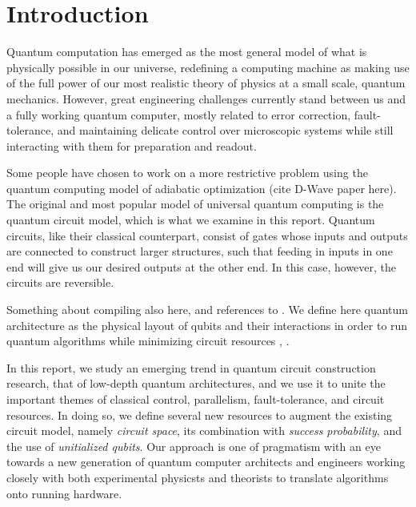 \section{Introduction}
\label{sec:intro}

Quantum computation has emerged as the most general model of what is
physically possible in our universe, redefining a computing machine as
making use of the full power of our most realistic theory of physics
at a small scale, quantum mechanics. However, great engineering challenges
currently stand between us and a fully working quantum computer, mostly
related to error correction, fault-tolerance, and maintaining delicate
control over microscopic systems while still interacting with them for
preparation and readout.

Some people have chosen to work on a more restrictive problem using
the quantum computing model of adiabatic optimization (cite D-Wave paper here).
The original and most popular model of universal quantum computing is the
quantum circuit model, which is what we examine in this report.
Quantum circuits, like their classical counterpart, consist of gates
whose inputs and outputs are connected to construct larger structures,
such that feeding in inputs in one end will give us our desired outputs at
the other end. In this case, however, the circuits are reversible.

Something about compiling also here, and references to
\cite{Pham2012a}. We define here quantum architecture as the physical
layout of qubits and their interactions in order to run quantum algorithms
while minimizing circuit resources \cite{VanMeter2006}, \cite{Pham2012b}.


In this report, we study an emerging trend in quantum circuit construction
research, that of low-depth quantum architectures, and we use it to unite
the important themes of classical control, parallelism, fault-tolerance,
and circuit resources. In doing so, we define several new resources to
augment the existing circuit model, namely \emph{circuit space}, its
combination with \emph{success probability}, and the use of
\emph{unitialized qubits}. Our approach is one of pragmatism with an
eye towards a new generation of quantum computer architects and engineers
working closely with both experimental physicsts and theorists to translate
algorithms onto running hardware.

